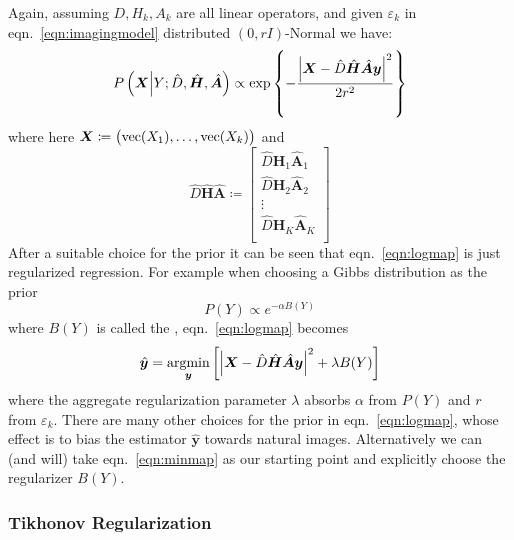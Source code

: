 %
Again, assuming \(D, H_k, A_k\) are all linear operators, and given \(\varepsilon_k\) in eqn.~\eqref{eqn:imagingmodel} distributed \((0, rI)\)-Normal we have:
\begin{equation}
    P\left(\bm{X} \middle| Y; \hat{D},  \hat{\bm{H}}, \hat{\bm{A}} \right) \propto \exp \left\{ -\frac{\abs{ \bm{X} - \hat{D} \hat{\bm{H}} \hat{\bm{A}} \bm{y} }^2}{2r^2} \right\}
\end{equation}
where here \(\bm{X} \coloneqq \left( \text{vec}(X_1), \mathellipsis, \text{vec}(X_k) \right)\) and
\begin{equation}
    \hat{D} \hat{\bm{H}} \hat{\bm{A}} \coloneqq \begin{bmatrix}
        \hat{D} \hat{\bm{H}}_1 \hat{\bm{A}}_1 \\
        \hat{D} \hat{\bm{H}}_2 \hat{\bm{A}}_2 \\
        \vdots                                \\
        \hat{D} \hat{\bm{H}}_K \hat{\bm{A}}_K \\
    \end{bmatrix}
\end{equation}
%
After a suitable choice for the prior it can be seen that eqn.~\eqref{eqn:logmap} is just regularized regression.
%
For example when choosing a Gibbs \cite{Hardie1997} distribution as the prior
\begin{equation}
    P(Y) \propto e^{-\alpha B(Y)}
    \label{eqn:gibbs}
\end{equation}
where \(B(Y)\) is called the , eqn.~\eqref{eqn:logmap} becomes
\begin{equation}
    \hat{\bm{y}} = \underset{\bm{y}}{\text{argmin}}\left[ \abs{ \bm{X} - \hat{D} \hat{\bm{H}} \hat{\bm{A}} \bm{y} }^2 +\lambda B(Y)\right]
    \label{eqn:minmap}
\end{equation}
where the aggregate regularization parameter \(\lambda\) absorbs \(\alpha\) from \(P(Y)\) and \(r\) from \(\varepsilon_k\).
%
There are many other choices for the prior in eqn.~\eqref{eqn:logmap}, whose effect is to bias the estimator \(\hat{\bm{y}}\) towards natural images.
%
Alternatively we can (and will) take eqn.~\eqref{eqn:minmap} as our starting point and explicitly choose the regularizer \(B(Y)\).

\subsubsection{Tikhonov Regularization}


